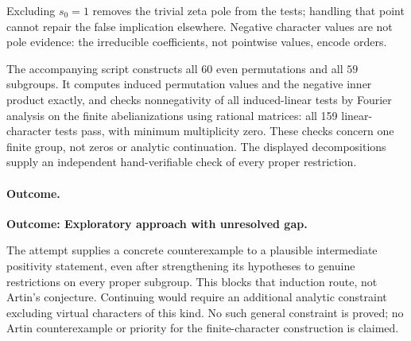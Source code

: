 \documentclass[11pt,a4paper]{article}
\numberwithin{equation}{section}
\begin{document}
Excluding $s_0=1$ removes the trivial zeta pole from the tests; handling that point cannot repair the false implication elsewhere. Negative character values are not pole evidence: the irreducible coefficients, not pointwise values, encode orders.

The accompanying script constructs all $60$ even permutations and all $59$ subgroups. It computes induced permutation values and the negative inner product exactly, and checks nonnegativity of all induced-linear tests by Fourier analysis on the finite abelianizations using rational matrices: all 159 linear-character tests pass, with minimum multiplicity zero. These checks concern one finite group, not zeros or analytic continuation. The displayed decompositions supply an independent hand-verifiable check of every proper restriction.

\paragraph{Outcome.}
\textbf{Outcome: Exploratory approach with unresolved gap.}

The attempt supplies a concrete counterexample to a plausible intermediate positivity statement, even after strengthening its hypotheses to genuine restrictions on every proper subgroup. This blocks that induction route, not Artin's conjecture. Continuing would require an additional analytic constraint excluding virtual characters of this kind. No such general constraint is proved; no Artin counterexample or priority for the finite-character construction is claimed.

\end{document}
